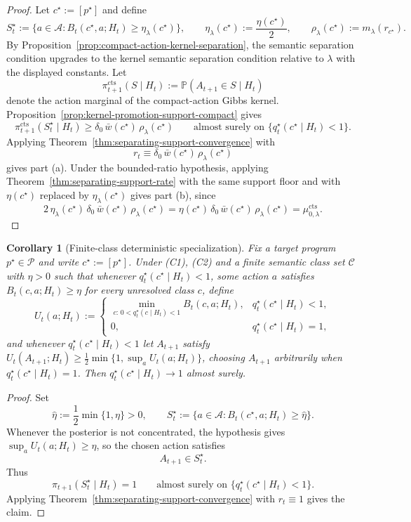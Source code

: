\documentclass[11pt]{article}
\newtheorem{corollary}[theorem]{Corollary}
\theoremstyle{definition}
\theoremstyle{remark}
\newcommand{\Acal}{\mathcal{A}}
\newcommand{\Ccal}{\mathcal{C}}
\newcommand{\Pcal}{\mathcal{P}}
\newcommand{\Prob}{\mathbb{P}}
\begin{document}
\begin{proof}
Let $c^\star:=[p^\star]$ and define
\[
S_t^\star:=\{a\in\Acal:B_t(c^\star,a;H_t)\ge \eta_\lambda(c^\star)\},
\qquad
\eta_\lambda(c^\star):=\frac{\eta(c^\star)}{2},
\qquad
\rho_\lambda(c^\star):=m_\lambda(r_{c^\star}).
\]
By Proposition~\ref{prop:compact-action-kernel-separation}, the semantic separation condition upgrades to the kernel semantic separation condition relative to $\lambda$ with the displayed constants. Let
\[
\pi_{t+1}^{\mathrm{cts}}(S\mid H_t):=\Prob(A_{t+1}\in S\mid H_t)
\]
denote the action marginal of the compact-action Gibbs kernel. Proposition~\ref{prop:kernel-promotion-support-compact} gives
\[
\pi_{t+1}^{\mathrm{cts}}(S_t^\star\mid H_t)\ge \delta_0\,\bar w(c^\star)\,\rho_\lambda(c^\star)
\qquad\text{almost surely on }\{q_t^\star(c^\star\mid H_t)<1\}.
\]
Applying Theorem~\ref{thm:separating-support-convergence} with
\[
r_t\equiv \delta_0\,\bar w(c^\star)\,\rho_\lambda(c^\star)
\]
gives part \textup{(a)}. Under the bounded-ratio hypothesis, applying Theorem~\ref{thm:separating-support-rate} with the same support floor and with $\eta(c^\star)$ replaced by $\eta_\lambda(c^\star)$ gives part \textup{(b)}, since
\[
2\,\eta_\lambda(c^\star)\,\delta_0\,\bar w(c^\star)\,\rho_\lambda(c^\star)
=
\eta(c^\star)\,\delta_0\,\bar w(c^\star)\,\rho_\lambda(c^\star)
=
\mu_{0,\lambda}^{\mathrm{cts}}.
\]
\end{proof}

\begin{corollary}[Finite-class deterministic specialization]
\label{cor:finite-maximin}
Fix a target program $p^\star\in\Pcal$ and write $c^\star:=[p^\star]$. Under (C1), (C2) and a finite semantic class set $\Ccal$ with $\eta>0$ such that whenever $q_t^\star(c^\star\mid H_t)<1$, some action $a$ satisfies $B_t(c,a;H_t)\ge\eta$ for every unresolved class $c$, define
\[
U_t(a;H_t):=
\begin{cases}
\min_{c:\,0<q_t^\star(c\mid H_t)<1}B_t(c,a;H_t), & q_t^\star(c^\star\mid H_t)<1,\\
0, & q_t^\star(c^\star\mid H_t)=1,
\end{cases}
\]
and whenever $q_t^\star(c^\star\mid H_t)<1$ let $A_{t+1}$ satisfy $U_t(A_{t+1};H_t)\ge\tfrac{1}{2}\min\{1,\sup_a U_t(a;H_t)\}$, choosing $A_{t+1}$ arbitrarily when $q_t^\star(c^\star\mid H_t)=1$. Then $q_t^\star(c^\star\mid H_t)\to 1$ almost surely.
\end{corollary}

\begin{proof}
Set
\[
\hat\eta:=\frac{1}{2}\min\{1,\eta\}>0,
\qquad
S_t^\star:=\{a\in\Acal:B_t(c^\star,a;H_t)\ge \hat\eta\}.
\]
Whenever the posterior is not concentrated, the hypothesis gives $\sup_a U_t(a;H_t)\ge\eta$, so the chosen action satisfies
\[
A_{t+1}\in S_t^\star.
\]
Thus
\[
\pi_{t+1}(S_t^\star\mid H_t)=1
\qquad\text{almost surely on }\{q_t^\star(c^\star\mid H_t)<1\}.
\]
Applying Theorem~\ref{thm:separating-support-convergence} with $r_t\equiv 1$ gives the claim.
\end{proof}
\end{document}
